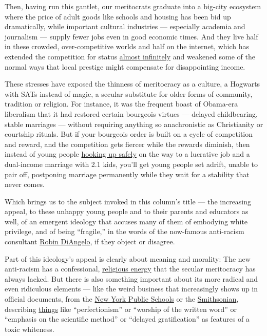 Then, having run this gantlet, our meritocrats graduate into a big-city
ecosystem where the price of adult goods like schools and housing has
been bid up dramatically, while important cultural industries ---
especially academia and journalism --- supply fewer jobs even in good
economic times. And they live half in these crowded, over-competitive
worlds and half on the internet, which has extended the competition for
status
\href{https://www.mercatus.org/bridge/commentary/looking-glass-politics}{almost
infinitely} and weakened some of the normal ways that local prestige
might compensate for disappointing income.

These stresses have exposed the thinness of meritocracy as a culture, a
Hogwarts with SATs instead of magic, a secular substitute for older
forms of community, tradition or religion. For instance, it was the
frequent boast of Obama-era liberalism that it had restored certain
bourgeois virtues --- delayed childbearing, stable marriages --- without
requiring anything so anachronistic as Christianity or courtship
rituals. But if your bourgeois order is built on a cycle of competition
and reward, and the competition gets fiercer while the rewards diminish,
then instead of young people
\href{https://www.theatlantic.com/magazine/archive/2012/09/boys-on-the-side/309062/}{hooking
up safely} on the way to a lucrative job and a dual-income marriage with
2.1 kids, you'll get young people set adrift, unable to pair off,
postponing marriage permanently while they wait for a stability that
never comes.

Which brings us to the subject invoked in this column's title --- the
increasing appeal, to these unhappy young people and to their parents
and educators as well, of an emergent ideology that accuses many of them
of embodying white privilege, and of being ``fragile,'' in the words of
the now-famous anti-racism consultant
\href{https://www.nytimes.com/2020/07/15/magazine/white-fragility-robin-diangelo.html}{Robin
DiAngelo}, if they object or disagree.

Part of this ideology's appeal is clearly about meaning and morality:
The new anti-racism has a confessional,
\href{https://www.nytimes.com/2020/07/07/opinion/protestant-progressive-reformation.html}{religious
energy} that the secular meritocracy has always lacked. But there is
also something important about its more radical and even ridiculous
elements --- like the weird business that increasingly shows up in
official documents, from the
\href{https://nypost.com/2019/05/20/richard-carranza-held-doe-white-supremacy-culture-training/}{New
York Public Schools} or the
\href{https://twitter.com/ByronYork/status/1283372233730203651}{Smithsonian},
describing
\href{https://www.nytimes.com/2020/07/15/magazine/white-fragility-robin-diangelo.html}{things}
like ``perfectionism'' or ``worship of the written word'' or ``emphasis
on the scientific method'' or ``delayed gratification'' as features of a
toxic whiteness.

